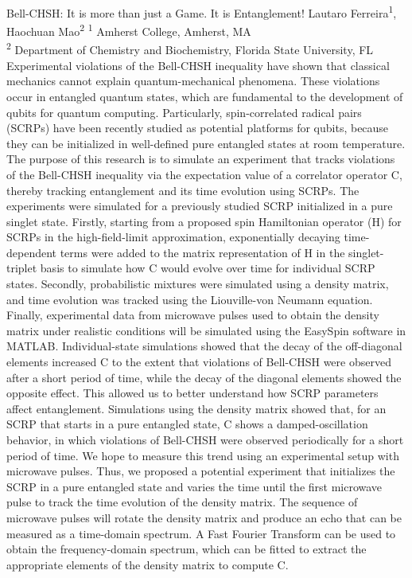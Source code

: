 \makeabstract
    {
    Bell-CHSH: It is more than just a Game. It is Entanglement!
    }
    {
    Lautaro Ferreira\textsuperscript{1}, Haochuan Mao\textsuperscript{2}
    }
    {
    \textsuperscript{1} Amherst College, Amherst, MA\\
\textsuperscript{2} Department of Chemistry and Biochemistry, Florida State University, FL
    }
    {
    Experimental violations of the Bell-CHSH inequality have shown that classical mechanics cannot explain quantum-mechanical phenomena. These violations occur in entangled quantum states, which are fundamental to the development of qubits for quantum computing. Particularly, spin-correlated radical pairs (SCRPs) have been recently studied as potential platforms for qubits, because they can be initialized in well-defined pure entangled states at room temperature. The purpose of this research is to simulate an experiment that tracks violations of the Bell-CHSH inequality via the expectation value of a correlator operator C, thereby tracking entanglement and its time evolution using SCRPs.
    }
    {
    The experiments were simulated for a previously studied SCRP initialized in a pure singlet state. Firstly, starting from a proposed spin Hamiltonian operator (H) for SCRPs in the high-field-limit approximation, exponentially decaying time-dependent terms were added to the matrix representation of H in the singlet-triplet basis to simulate how C would evolve over time for individual SCRP states. Secondly, probabilistic mixtures were simulated using a density matrix, and time evolution was tracked using the Liouville-von Neumann equation. Finally, experimental data from microwave pulses used to obtain the density matrix under realistic conditions will be simulated using the EasySpin software in MATLAB.
    }
    {
    Individual-state simulations showed that the decay of the off-diagonal elements increased C to the extent that violations of Bell-CHSH were observed after a short period of time, while the decay of the diagonal elements showed the opposite effect. This allowed us to better understand how SCRP parameters affect entanglement. Simulations using the density matrix showed that, for an SCRP that starts in a pure entangled state, C shows a damped-oscillation behavior, in which violations of Bell-CHSH were observed periodically for a short period of time. We hope to measure this trend using an experimental setup with microwave pulses. Thus, we proposed a potential experiment that initializes the SCRP in a pure entangled state and varies the time until the first microwave pulse to track the time evolution of the density matrix. The sequence of microwave pulses will rotate the density matrix and produce an echo that can be measured as a time-domain spectrum. A Fast Fourier Transform can be used to obtain the frequency-domain spectrum, which can be fitted to extract the appropriate elements of the density matrix to compute C.
    }
